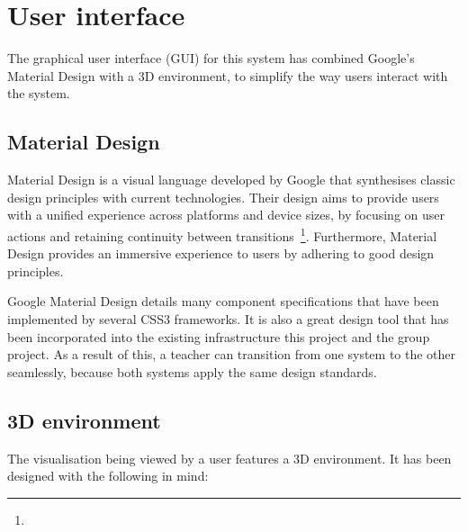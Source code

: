 \section{User interface} {
\label{sec:user_interface}

	The graphical user interface (GUI) for this system has combined Google's Material Design with a 3D environment, to simplify the way users interact with the system.

	\subsection{Material Design} {
	\label{sec:material_design}

		Material Design is a visual language developed by Google that synthesises classic design principles with current technologies. Their design aims to provide users with a unified experience across platforms and device sizes, by focusing on user actions and retaining continuity between transitions~\footnote{}. Furthermore, Material Design provides an immersive experience to users by adhering to good design principles.

		Google Material Design details many component specifications that have been implemented by several CSS3 frameworks. It is also a great design tool that has been incorporated into the existing infrastructure this project and the group project. As a result of this, a teacher can transition from one system to the other seamlessly, because both systems apply the same design standards.

	}

	\subsection{3D environment} {
	\label{sec:3d_environment}

		The visualisation being viewed by a user features a 3D environment. It has been designed with the following in mind:

}}
